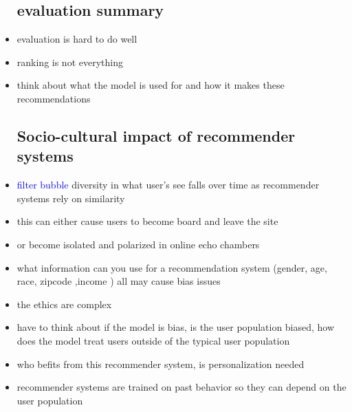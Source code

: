 \documentclass{article}
\begin{document}
\begin{itemize}
\subsection*{evaluation summary}
\item evaluation is hard to do well 
\item ranking is not everything 
\item think about what the model is used for and how it makes these recommendations 
\subsection*{Socio-cultural impact of
recommender systems}
\item \textcolor{blue}{filter bubble} diversity in what user's see falls over time as recommender systems rely on similarity
\item this can either cause users to become board and leave the site 
\item or become isolated and polarized in online echo chambers 
\item what information can you use for a recommendation system (gender, age, race, zipcode ,income ) all may cause bias issues 
\item the ethics are complex 
\item have to think about if the model is bias, is the user population biased, how does the model treat users outside of the typical user population 
\item who befits from this recommender system, is personalization needed  
\item recommender systems are trained on past behavior so they can depend on the user population 
\end{itemize}
\end{document}
